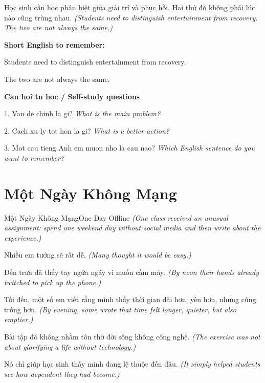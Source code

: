 \begin{baihoc}
Học sinh cần học phân biệt giữa giải trí và phục hồi. Hai thứ đó không phải lúc nào cũng trùng nhau.
\textit{(Students need to distinguish entertainment from recovery. The two are not always the same.)}
\end{baihoc}

\begin{ghinhoanh}
\textbf{Short English to remember:}

Students need to distinguish entertainment from recovery.

The two are not always the same.

\end{ghinhoanh}

\begin{tuhocnhanh}
\textbf{Cau hoi tu hoc / Self-study questions}

1. Van de chinh la gi? \textit{What is the main problem?}

2. Cach xu ly tot hon la gi? \textit{What is a better action?}

3. Mot cau tieng Anh em muon nho la cau nao? \textit{Which English sentence do you want to remember?}
\end{tuhocnhanh}
\ngancach

\section{Một Ngày Không Mạng}
\begin{truyen}{Một Ngày Không Mạng}{One Day Offline}
\textit{(One class received an unusual assignment: spend one weekend day without social media and then write about the experience.)}

Nhiều em tưởng sẽ rất dễ.
\textit{(Many thought it would be easy.)}

Đến trưa đã thấy tay ngứa ngáy vì muốn cầm máy.
\textit{(By noon their hands already twitched to pick up the phone.)}

Tối đến, một số em viết rằng mình thấy thời gian dài hơn, yên hơn, nhưng cũng trống hơn.
\textit{(By evening, some wrote that time felt longer, quieter, but also emptier.)}

Bài tập đó không nhằm tôn thờ đời sống không công nghệ.
\textit{(The exercise was not about glorifying a life without technology.)}

Nó chỉ giúp học sinh thấy mình đang lệ thuộc đến đâu.
\textit{(It simply helped students see how dependent they had become.)}

\end{truyen}


